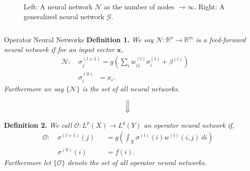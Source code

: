 
\begin{figure}
\centering

\caption{Left: A neural network $\mathcal{N}$ as the number of nodes $\to \infty.$ Right: 
A generalized neural network $\mathcal{G}.$}
\end{figure}


\begin{columns}[t,totalwidth=\twocolwid] %

\begin{column}{\onecolwid}\vspace{-.6in} %

	\begin{block}{Operator Neural Networks}
	 	\textbf{Definition 1.}
	    \emph{We say $\mathcal{N}: \mathbb{R}^n \to \mathbb{R}^m$ is a feed-forward neural network if for an input vector $\pmb{x}$,}
	        \begin{equation}
	                \begin{aligned}
	            \mathcal{N}:\ & \sigma_j^{(l+1)} = g\left(\sum_{i}w_{ij}^{(l)}\sigma_i^{(l)} + \beta^{(l)}\right) &\\  & \sigma_i^{(0)} \ \ \ =x_i.& 
	            \end{aligned}
	        \end{equation}
	         \emph{Furthermore we say $\{\mathcal{N}\}$ is the set of all neural networks.}


	      \begin{equation*}
			\Big\Downarrow      
	      \end{equation*}

	     \textbf{Definition 2. }\emph{We call $\mathcal{O}: L^p(X) \to L^q(Y)$ an operator neural network if,}
		\begin{equation}
	          \begin{alignedat}{2}
	        \mathcal{O}:\ &\sigma^{(l+1)}(j) & &=  g\left(\int_{X} \sigma^{(l)}(i) w^{(l)}(i,j)\ di \right)  \\
	        &\sigma^{(0)}(i) & &= f(i). 
	        \end{alignedat}
		\end{equation}
		\emph{Furthermore let $\{\mathcal{O}\}$ denote the set of all operator neural networks.}
	\end{block}


\end{column} %



\end{columns}
